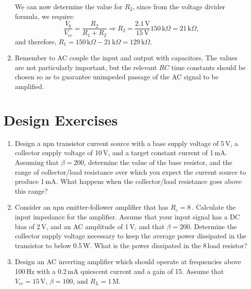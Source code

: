 \documentclass{article}
\begin{document}
\begin{enumerate}
We can now determine the value for $R_2$, since from the voltage divider formula, we require:
\begin{equation}
\frac{V_b}{V_{cc}} = \frac{R_2}{R_1 + R_2} \Rightarrow R_2 = \frac{2.1\,\mbox{V}}{15\,\mbox{V}} 150\,\mbox{k}\Omega = 21\,\mbox{k}\Omega,
\end{equation}
and therefore, $R_1 = 150\,\mbox{k}\Omega - 21\,\mbox{k}\Omega = 129\,\mbox{k}\Omega$.
\item Remember to AC couple the input and output with capacitors. The values are not particularly important, but the relevant $RC$ time constants should be chosen so as to guarantee unimpeded passage of the AC signal to be amplified.
\end{enumerate}


\pagebreak

\section{Design Exercises}

\begin{enumerate}
\item \label{ex:constant_current_source} Design a npn transistor current source with a base supply voltage of 5\,V, a collector supply voltage of 10\,V, and a target constant current of 1\,mA. Assuming that $\beta = 200$, determine the value of the base resistor, and the range of collector/load resistance over which you expect the current source to produce 1\,mA. What happens when the collector/load resistance goes above this range? 


\item \label{ex:emitter_follower} Consider an npn emitter-follower amplifier that has $R_e = 8$\,\Ohm. Calculate the input impedance for the amplifier. Assume that your input signal has a DC bias of 2\,V, and an AC amplitude of 1\,V, and that $\beta = 200$. Determine the collector supply voltage necessary to keep the average power dissipated in the transistor to below 0.5\,W. What is the power dissipated in the 8\,\Ohm load resistor?


\item \label{ex:AC_inverting_amplifier} Design an AC inverting amplifier which should operate at frequencies above 100\,Hz with a 0.2\,mA quiescent current and a gain of 15. Assume that $V_{cc} = 15$\,V, $\beta = 100$, and $R_L = 1$\,M\Ohm.
\end{enumerate}
\end{document}
